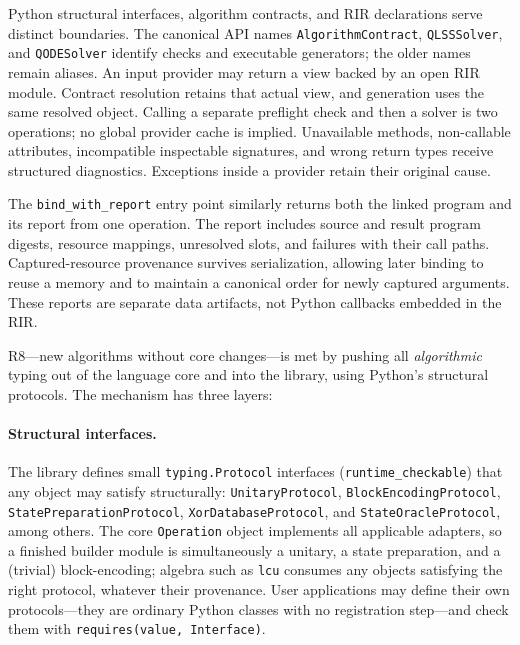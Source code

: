 Python structural interfaces, algorithm contracts, and RIR declarations
serve distinct boundaries. The canonical API names
\texttt{AlgorithmContract}, \texttt{QLSSSolver}, and \texttt{QODESolver}
identify checks and executable generators; the older names remain aliases.
An input provider may return a view backed by an open RIR module.
Contract resolution retains that actual view, and generation uses the
same resolved object. Calling a separate preflight check and then a solver
is two operations; no global provider cache is implied.
Unavailable methods, non-callable attributes, incompatible inspectable
signatures, and wrong return types receive structured diagnostics.
Exceptions inside a provider retain their original cause.

The \texttt{bind\_with\_report} entry point similarly returns both the
linked program and its report from one operation. The report includes
source and result program digests, resource mappings, unresolved slots,
and failures with their call paths. Captured-resource provenance survives
serialization, allowing later binding to reuse a memory and to maintain
a canonical order for newly captured arguments. These reports are
separate data artifacts, not Python callbacks embedded in the RIR.

R8---new algorithms without core changes---is met by pushing all
\emph{algorithmic} typing out of the language core and into the library,
using Python's structural protocols.  The mechanism has three layers:

\paragraph{Structural interfaces.}
The library defines small \texttt{typing.Protocol} interfaces
(\texttt{runtime\_checkable}) that any object may satisfy structurally:
\texttt{UnitaryProtocol}, \texttt{Block\-Encoding\-Protocol},
\texttt{State\-Preparation\-Protocol}, \texttt{XorDatabase\-Protocol},
and \texttt{StateOracleProtocol}, among others.  The core \texttt{Operation} object
implements all applicable adapters, so a finished builder module is
simultaneously a unitary, a state preparation, and a (trivial)
block-encoding; algebra such as \texttt{lcu} consumes any objects satisfying
the right protocol, whatever their provenance.  User applications may define
their own protocols---they are ordinary Python classes with no registration
step---and check them with \texttt{requires(value, Interface)}.

